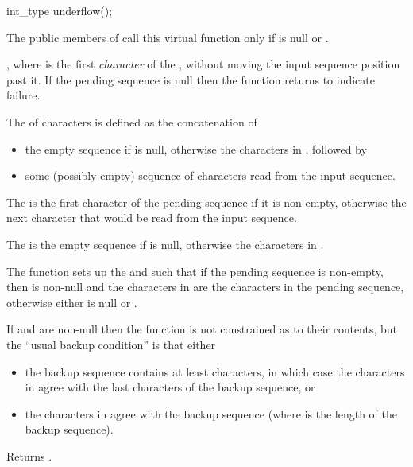 %
\begin{itemdecl}
int_type underflow();
\end{itemdecl}

\begin{itemdescr}
\pnum
\remarks
The public members of
call this virtual function only if
is null or
.

\pnum
\returns
{},
where  is the first
\textit{character}
of the
,
without moving the input sequence position past it.
If the pending sequence is null then the function returns
to indicate failure.

\pnum
The
of characters is defined as the concatenation of
\begin{itemize}
\item the empty sequence if  is null, otherwise the
characters in
,
followed by
\item
some (possibly empty) sequence of characters read from the input sequence.
\end{itemize}

\pnum
The
is
the first character of the pending sequence if it is non-empty,
otherwise
the next character that would be read from the input sequence.

\pnum
The
is the empty sequence if  is null, otherwise the
characters in
.

\pnum
\effects
The function sets up the
and
such that
if the pending sequence is non-empty, then
is non-null and
the characters in  are
the characters in the pending sequence,
otherwise
either 
is null or
.

\pnum
If
and
are non-null then the function is not constrained as to their contents, but the ``usual backup condition'' is that either
\begin{itemize}
\item
the backup sequence contains at least
characters, in which case the characters in
agree with the last
characters of the backup sequence, or
\item
the characters in 
agree with the backup sequence (where  is the length of the backup sequence).
\end{itemize}

\pnum
{}
Returns
.
\end{itemdescr}


